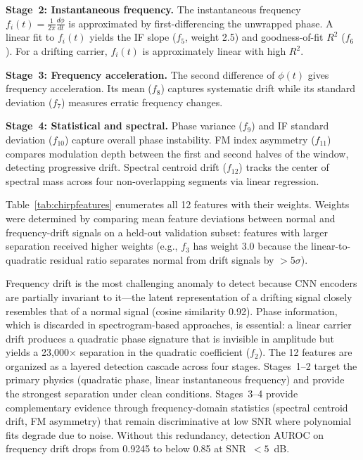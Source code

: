 \documentclass[conference]{IEEEtran}
\begin{document}
\textbf{Stage~2: Instantaneous frequency.} The instantaneous frequency $f_i(t) = \frac{1}{2\pi}\frac{d\phi}{dt}$ is approximated by first-differencing the unwrapped phase. A linear fit to $f_i(t)$ yields the IF slope ($f_5$, weight 2.5) and goodness-of-fit $R^2$ ($f_6$). For a drifting carrier, $f_i(t)$ is approximately linear with high $R^2$.

\textbf{Stage~3: Frequency acceleration.} The second difference of $\phi(t)$ gives frequency acceleration. Its mean ($f_8$) captures systematic drift while its standard deviation ($f_7$) measures erratic frequency changes.

\textbf{Stage~4: Statistical and spectral.} Phase variance ($f_9$) and IF standard deviation ($f_{10}$) capture overall phase instability. FM index asymmetry ($f_{11}$) compares modulation depth between the first and second halves of the window, detecting progressive drift. Spectral centroid drift ($f_{12}$) tracks the center of spectral mass across four non-overlapping segments via linear regression.

Table~\ref{tab:chirpfeatures} enumerates all 12 features with their weights. Weights were determined by comparing mean feature deviations between normal and frequency-drift signals on a held-out validation subset: features with larger separation received higher weights (e.g., $f_3$ has weight 3.0 because the linear-to-quadratic residual ratio separates normal from drift signals by $>$5$\sigma$).

Frequency drift is the most challenging anomaly to detect because CNN encoders are partially invariant to it---the latent representation of a drifting signal closely resembles that of a normal signal (cosine similarity 0.92). Phase information, which is discarded in spectrogram-based approaches, is essential: a linear carrier drift produces a quadratic phase signature that is invisible in amplitude but yields a 23{,}000$\times$ separation in the quadratic coefficient ($f_2$). The 12 features are organized as a layered detection cascade across four stages. Stages~1--2 target the primary physics (quadratic phase, linear instantaneous frequency) and provide the strongest separation under clean conditions. Stages~3--4 provide complementary evidence through frequency-domain statistics (spectral centroid drift, FM asymmetry) that remain discriminative at low SNR where polynomial fits degrade due to noise. Without this redundancy, detection AUROC on frequency drift drops from 0.9245 to below 0.85 at SNR~$< 5$~dB.
\end{document}
